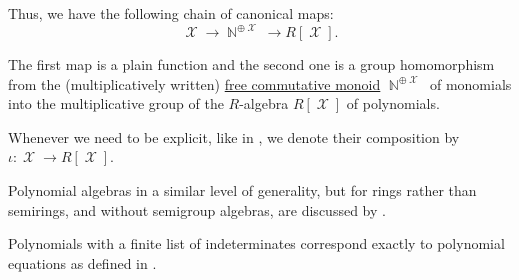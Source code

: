 \begin{definition}
\begin{thmenum}
     Thus, we have the following chain of canonical maps:
    \begin{equation*}
      \mscrX \to \BbbN^{\oplus \mscrX} \to R[\mscrX].
    \end{equation*}

    The first map is a plain function and the second one is a group homomorphism from the (multiplicatively written) \hyperref[def:free_commutative_monoid]{free commutative monoid} \( \BbbN^{\oplus \mscrX} \) of monomials into the multiplicative group of the \( R \)-algebra \( R[\mscrX] \) of polynomials.

    Whenever we need to be explicit, like in , we denote their composition by \( \iota: \mscrX \to R[\mscrX] \).
  \end{thmenum}
\end{definition}
\begin{comments}
  \item Polynomial algebras in a similar level of generality, but for rings rather than semirings, and without semigroup algebras, are discussed by .

  \item Polynomials with a finite list of indeterminates correspond exactly to polynomial equations as defined in .
\end{comments}

